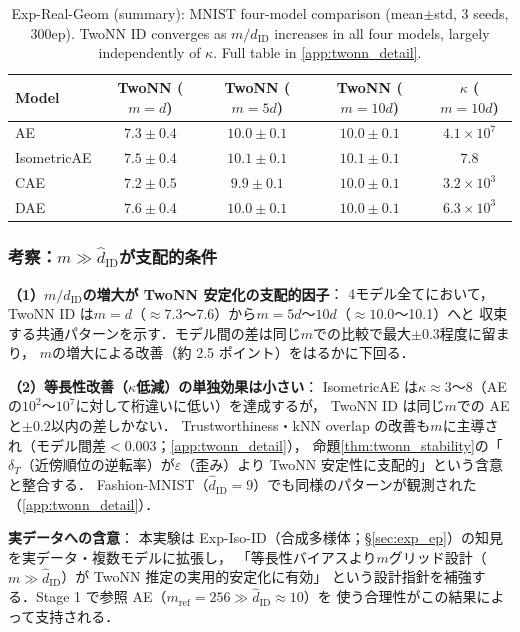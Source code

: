 \documentclass[11pt,a4paper]{jsarticle}
\newcommand{\kap}{\kappa}
\begin{document}
\begin{table}[H]
\centering
\caption{Exp-Real-Geom (summary): MNIST four-model comparison (mean$\pm$std, 3 seeds, 300ep). TwoNN ID converges as $m/\hat{d}_\mathrm{ID}$ increases in all four models, largely independently of $\kap$. Full table in \ref{app:twonn_detail}.}
\label{tab:real_geom_summary}
\small
\begin{tabular}{lcccc}
\toprule
Model & TwoNN ($m{=}d$) & TwoNN ($m{=}5d$) & TwoNN ($m{=}10d$) & $\kap$ ($m{=}10d$) \\
\midrule
AE          & $7.3\pm0.4$ & $10.0\pm0.1$ & $10.0\pm0.1$ & $4.1\times10^7$ \\
IsometricAE & $7.5\pm0.4$ & $10.1\pm0.1$ & $10.1\pm0.1$ & $7.8$ \\
CAE         & $7.2\pm0.5$ & $9.9\pm0.1$  & $10.0\pm0.1$ & $3.2\times10^3$ \\
DAE         & $7.6\pm0.4$ & $10.0\pm0.1$ & $10.0\pm0.1$ & $6.3\times10^3$ \\
\bottomrule
\end{tabular}
\end{table}

\subsubsection*{考察：$m \gg \hat{d}_\mathrm{ID}$が支配的条件}

\textbf{（1）$m/\hat{d}_\mathrm{ID}$の増大が TwoNN 安定化の支配的因子}：
4モデル全てにおいて，TwoNN ID は$m=d$（$\approx 7.3$〜7.6）から$m=5d$〜$10d$（$\approx 10.0$〜10.1）へと
収束する共通パターンを示す．モデル間の差は同じ$m$での比較で最大$\pm0.3$程度に留まり，
$m$の増大による改善（約 2.5 ポイント）をはるかに下回る．

\textbf{（2）等長性改善（$\kap$低減）の単独効果は小さい}：
IsometricAE は$\kap \approx 3$〜8（AE の$10^2$〜$10^7$に対して桁違いに低い）を達成するが，
TwoNN ID は同じ$m$での AE と$\pm 0.2$以内の差しかない．
Trustworthiness・kNN overlap の改善も$m$に主導され（モデル間差$< 0.003$；\ref{app:twonn_detail}），
命題\ref{thm:twonn_stability}の「$\delta_T$（近傍順位の逆転率）が$\varepsilon$（歪み）より
TwoNN 安定性に支配的」という含意と整合する．
Fashion-MNIST（$\hat{d}_\mathrm{ID}=9$）でも同様のパターンが観測された（\ref{app:twonn_detail}）．

\textbf{実データへの含意}：
本実験は Exp-Iso-ID（合成多様体；§\ref{sec:exp_ep}）の知見を実データ・複数モデルに拡張し，
「等長性バイアスより$m$グリッド設計（$m \gg \hat{d}_\mathrm{ID}$）が TwoNN 推定の実用的安定化に有効」
という設計指針を補強する．Stage 1 で参照 AE（$m_\mathrm{ref}=256 \gg \hat{d}_\mathrm{ID} \approx 10$）を
使う合理性がこの結果によって支持される．
\end{document}
